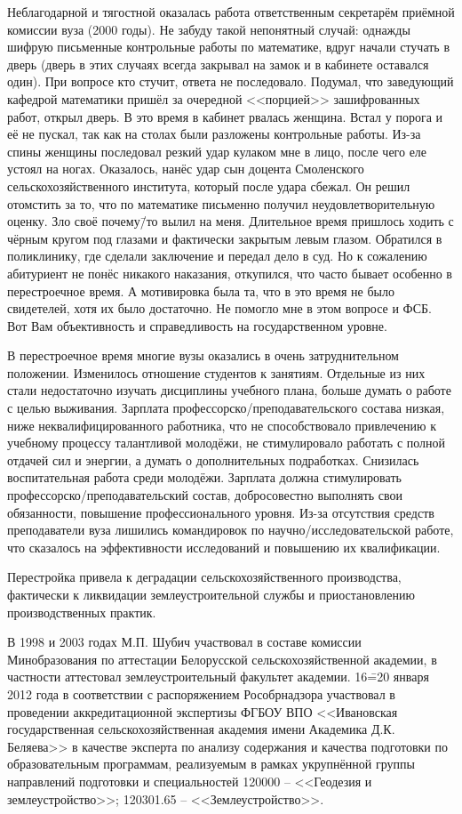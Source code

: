 Неблагодарной и тягостной оказалась работа ответственным секретарём приёмной комиссии вуза (2000 годы). Не забуду такой непонятный случай: однажды шифрую письменные контрольные работы по математике, вдруг начали стучать в дверь (дверь в этих случаях всегда закрывал на замок и в кабинете оставался один). При вопросе кто стучит, ответа не последовало. Подумал, что заведующий кафедрой математики пришёл за очередной <<порцией>> зашифрованных работ, открыл дверь. В это время в кабинет рвалась женщина. Встал у порога и её не пускал, так как на столах были разложены контрольные работы. Из-за спины женщины последовал резкий удар кулаком мне в лицо, после чего еле устоял на ногах. Оказалось, нанёс удар сын доцента Смоленского сельскохозяйственного института, который после удара сбежал. Он решил отомстить за то, что по математике письменно получил неудовлетворительную оценку. Зло своё почему\=/то вылил на меня. Длительное время пришлось ходить с чёрным кругом под глазами и фактически закрытым левым глазом. Обратился в поликлинику, где сделали заключение и передал дело в суд. Но к сожалению абитуриент не понёс никакого наказания, откупился, что часто бывает особенно в перестроечное время. А мотивировка была та, что в это время не было свидетелей, хотя их было достаточно. Не помогло мне в этом вопросе и ФСБ. Вот Вам объективность и справедливость на государственном уровне.

В перестроечное время многие вузы оказались в очень затруднительном положении. Изменилось отношение студентов к занятиям. Отдельные из них стали недостаточно изучать дисциплины учебного плана, больше думать о работе с целью выживания. Зарплата профессорско\-/преподавательского состава низкая, ниже неквалифицированного работника, что не способствовало привлечению к учебному процессу талантливой молодёжи, не стимулировало работать с полной отдачей сил и энергии, а думать о дополнительных подработках. Снизилась воспитательная работа среди молодёжи. Зарплата должна стимулировать профессорско\-/преподавательский состав, добросовестно выполнять свои обязанности, повышение профессионального уровня. Из-за отсутствия средств преподаватели вуза лишились командировок по научно\-/исследовательской работе, что сказалось на эффективности исследований и повышению их квалификации. 

Перестройка привела к деградации сельскохозяйственного производства, фактически к ликвидации землеустроительной службы и приостановлению производственных практик. 

В 1998 и 2003 годах М.П. Шубич участвовал в составе комиссии Минобразования по аттестации Белорусской сельскохозяйственной академии, в частности аттестовал землеустроительный факультет академии. 16\==20 января 2012 года в соответствии с распоряжением Рособрнадзора участвовал в проведении аккредитационной экспертизы ФГБОУ ВПО <<Ивановская государственная сельскохозяйственная академия имени Академика Д.К. Беляева>> в качестве эксперта по анализу содержания и качества подготовки по образовательным программам, реализуемым в рамках укрупнённой группы направлений подготовки и специальностей 120000 \--- <<Геодезия и землеустройство>>; 120301.65 \--- <<Землеустройство>>.

